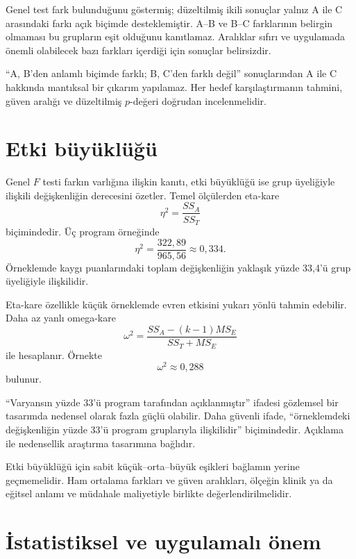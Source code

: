 Genel test fark bulunduğunu göstermiş; düzeltilmiş ikili sonuçlar yalnız A ile
C arasındaki farkı açık biçimde desteklemiştir. A--B ve B--C farklarının
belirgin olmaması bu grupların eşit olduğunu kanıtlamaz. Aralıklar sıfırı ve
uygulamada önemli olabilecek bazı farkları içerdiği için sonuçlar belirsizdir.

\begin{mistakebox}
``A, B'den anlamlı biçimde farklı; B, C'den farklı değil'' sonuçlarından A ile
C hakkında mantıksal bir çıkarım yapılamaz. Her hedef karşılaştırmanın tahmini,
güven aralığı ve düzeltilmiş $p$-değeri doğrudan incelenmelidir.
\end{mistakebox}

\section{Etki büyüklüğü}

Genel $F$ testi farkın varlığına ilişkin kanıtı, etki büyüklüğü ise grup
üyeliğiyle ilişkili değişkenliğin derecesini özetler. Temel ölçülerden
eta-kare
\[
\eta^2=\frac{SS_A}{SS_T}
\]
biçimindedir. Üç program örneğinde
\[
\eta^2=\frac{322{,}89}{965{,}56}\approx0{,}334.
\]
Örneklemde kaygı puanlarındaki toplam değişkenliğin yaklaşık yüzde 33,4'ü grup
üyeliğiyle ilişkilidir.

Eta-kare özellikle küçük örneklemde evren etkisini yukarı yönlü tahmin
edebilir. Daha az yanlı omega-kare
\[
\omega^2=
\frac{SS_A-(k-1)MS_E}{SS_T+MS_E}
\]
ile hesaplanır. Örnekte
\[
\omega^2\approx0{,}288
\]
bulunur.

\begin{researchbox}
``Varyansın yüzde 33'ü program tarafından açıklanmıştır'' ifadesi gözlemsel
bir tasarımda nedensel olarak fazla güçlü olabilir. Daha güvenli ifade,
``örneklemdeki değişkenliğin yüzde 33'ü program gruplarıyla ilişkilidir''
biçimindedir. Açıklama ile nedensellik araştırma tasarımına bağlıdır.
\end{researchbox}

Etki büyüklüğü için sabit küçük--orta--büyük eşikleri bağlamın yerine
geçmemelidir. Ham ortalama farkları ve güven aralıkları, ölçeğin klinik ya da
eğitsel anlamı ve müdahale maliyetiyle birlikte değerlendirilmelidir.

\section{İstatistiksel ve uygulamalı önem}

